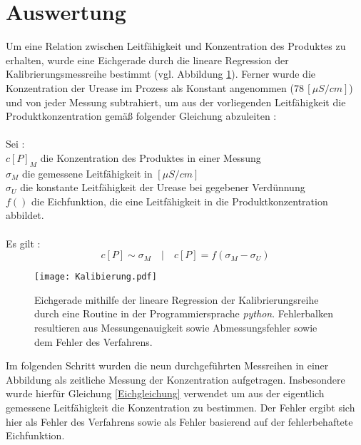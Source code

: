 %
%
\setlength\abovedisplayshortskip{20pt}
\setlength\belowdisplayshortskip{20pt}
\setlength\abovedisplayskip{20pt}
\setlength\belowdisplayskip{20pt}
\section {Auswertung}
Um eine Relation zwischen Leitfähigkeit und Konzentration des Produktes zu erhalten, wurde eine Eichgerade durch die lineare Regression der Kalibrierungsmessreihe bestimmt (vgl. Abbildung \ref{Eichgerade}). Ferner wurde die Konzentration der Urease im Prozess als Konstant angenommen ($ 78\,[\si{\mu S/cm}]$) und von jeder Messung subtrahiert, um aus der vorliegenden Leitfähigkeit die Produktkonzentration gemäß folgender Gleichung abzuleiten : \\
\\
Sei : \\
 $c[P]_M$ die Konzentration des Produktes in einer Messung\\
 $\sigma_M$ die gemessene Leitfähigkeit in $[\si{\mu S/cm}]$\\
  $\sigma_U$ die konstante Leitfähigkeit der Urease bei gegebener Verdünnung \\
  $f()$ die Eichfunktion, die eine Leitfähigkeit in die Produktkonzentration abbildet.\\
  \\
  Es gilt :
\begin{equation}
c[P]  \sim \sigma_M \quad| \quad c[P]=f(\sigma_M-\sigma_U)
\label{Eichgleichung}
\end{equation}
\begin{figure}[H]
	\centering	
	\begin{minipage}{1\textwidth}
		\texttt{[image: Kalibierung.pdf]}
	\end{minipage}
	\caption{Eichgerade mithilfe der lineare Regression der Kalibrierungsreihe durch eine Routine in der Programmiersprache \textit{python}. Fehlerbalken resultieren aus Messungenauigkeit sowie Abmessungsfehler sowie dem Fehler des Verfahrens.}
	\label{Eichgerade}
\end{figure}
Im folgenden Schritt wurden die neun durchgeführten Messreihen in einer Abbildung als zeitliche Messung der Konzentration aufgetragen. Insbesondere wurde hierfür Gleichung \ref{Eichgleichung} verwendet um aus der eigentlich gemessene Leitfähigkeit die Konzentration zu bestimmen. Der Fehler ergibt sich hier als Fehler des Verfahrens sowie als Fehler basierend auf der fehlerbehaftete Eichfunktion.
